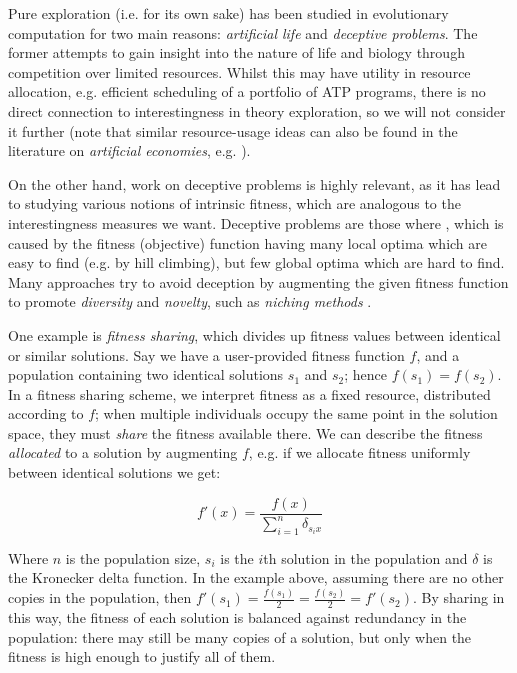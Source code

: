 Pure exploration (i.e. for its own sake) has been studied in evolutionary
computation for two main reasons: \emph{artificial life} and \emph{deceptive
  problems}. The former attempts to gain insight into the nature of life and
biology through competition over limited resources. Whilst this may have utility
in resource allocation, e.g. efficient scheduling of a portfolio of ATP
programs, there is no direct connection to interestingness in theory
exploration, so we will not consider it further (note that similar
resource-usage ideas can also be found in the literature on \emph{artificial
  economies}, e.g. \cite{baum2000evolution}).

On the other hand, work on deceptive problems is highly relevant, as it has lead
to studying various notions of intrinsic fitness, which are analogous to the
interestingness measures we want. Deceptive problems are those where
\cite{lehman2011abandoning}, which is caused by the fitness (objective)
function having many local optima which are easy to find (e.g. by hill
climbing), but few global optima which are hard to find. Many approaches try to
avoid deception by augmenting the given fitness function to promote
\emph{diversity} and \emph{novelty}, such as \emph{niching methods}
\cite{sareni1998fitness}.

One example is \emph{fitness sharing}, which divides up fitness values between
identical or similar solutions. Say we have a user-provided fitness function
$f$, and a population containing two identical solutions $s_1$ and $s_2$; hence
$f(s_1) = f(s_2)$. In a fitness sharing scheme, we interpret fitness as a fixed
resource, distributed according to $f$; when multiple individuals occupy the
same point in the solution space, they must \emph{share} the fitness available
there. We can describe the fitness \emph{allocated} to a solution by augmenting
$f$, e.g. if we allocate fitness uniformly between identical solutions we get:

$$f'(x) = \frac{f(x)}{\sum_{i=1}^n \delta_{s_i x}}$$

Where $n$ is the population size, $s_i$ is the $i$th solution in the population
and $\delta$ is the Kronecker delta function. In the example above, assuming
there are no other copies in the population, then
$f'(s_1) = \frac{f(s_1)}{2} = \frac{f(s_2)}{2} = f'(s_2)$. By sharing in this
way, the fitness of each solution is balanced against redundancy in the
population: there may still be many copies of a solution, but only when the
fitness is high enough to justify all of them.

